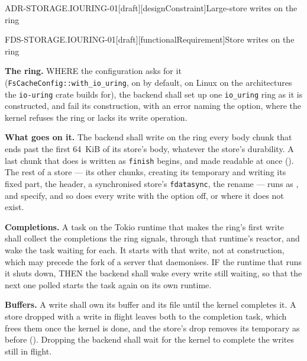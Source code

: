 \begin{requirement}{ADR-STORAGE.IOURING-01}[draft][designConstraint]{Large-store writes on the ring}


\end{requirement}

\begin{requirement}{FDS-STORAGE.IOURING-01}[draft][functionalRequirement]{Store writes on the ring}


  \textbf{The ring.} WHERE the configuration asks for it
  (\texttt{FsCacheConfig::with\_io\_uring}, on by default, on Linux on the
  architectures the \texttt{io-uring} crate builds for), the backend shall
  set up one \texttt{io\_uring} ring as it is constructed, and fail its
  construction, with an error naming the option, where the kernel refuses
  the ring or lacks its write operation.

  \textbf{What goes on it.} The backend shall write on the ring every body
  chunk that ends past the first 64~KiB of its store's body, whatever the
  store's durability. A last chunk that does is written as \texttt{finish}
  begins, and made readable at once (). The
  rest of a store --- its other chunks, creating its temporary and writing
  its fixed part, the header, a synchronised store's \texttt{fdatasync},
  the rename --- runs as ,
   and 
  specify, and so does every write with the option off, or where it does not
  exist.

  \textbf{Completions.} A task on the Tokio runtime that makes the ring's
  first write shall collect the completions the ring signals, through that
  runtime's reactor, and wake the task waiting for each. It starts with that
  write, not at construction, which may precede the fork of a server that
  daemonises. IF the runtime that runs it shuts down, THEN the backend shall
  wake every write still waiting, so that the next one polled starts the
  task again on its own runtime.

  \textbf{Buffers.} A write shall own its buffer and its file until the
  kernel completes it. A store dropped with a write in flight leaves both to
  the completion task, which frees them once the kernel is done, and the
  store's drop removes its temporary as before
  (). Dropping the backend shall wait for
  the kernel to complete the writes still in flight.


\end{requirement}
